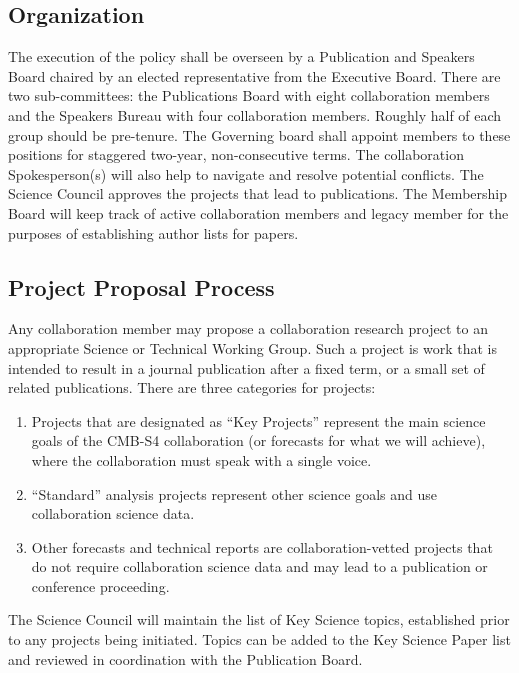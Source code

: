 \subsection{Organization}
The execution of the policy shall be overseen by a Publication and Speakers Board chaired by an elected representative from the Executive Board.  There are two sub-committees: the Publications Board with eight collaboration members and the Speakers Bureau with four collaboration members. Roughly half of each group should be pre-tenure. The Governing board shall appoint members to these positions for staggered two-year, non-consecutive terms. The collaboration Spokesperson(s) will also help to navigate and resolve potential conflicts. The Science Council approves the projects that lead to publications. The Membership Board will keep track of active collaboration members and legacy member for the purposes of establishing author lists for papers.

\subsection{Project Proposal Process}


Any collaboration member may propose a collaboration research project to an appropriate Science or Technical Working Group.  Such a project is work that is intended to result in a journal publication after a fixed term, or a small set of related publications.  There are three categories for projects:
\begin{enumerate}
  \item Projects that are designated as ``Key Projects'' represent the main science goals of the CMB-S4 collaboration (or forecasts for what we will achieve), where the collaboration must speak with a single voice.  
\item ``Standard'' analysis projects represent other science goals and use collaboration science data.  
\item Other forecasts and technical reports are collaboration-vetted projects that do not require collaboration science data and may lead to a publication or conference proceeding.  
\end{enumerate}
  The Science Council will maintain the list of Key Science topics, established prior to any projects being initiated.  Topics can be added to the Key Science Paper list and reviewed in coordination with the Publication Board.

